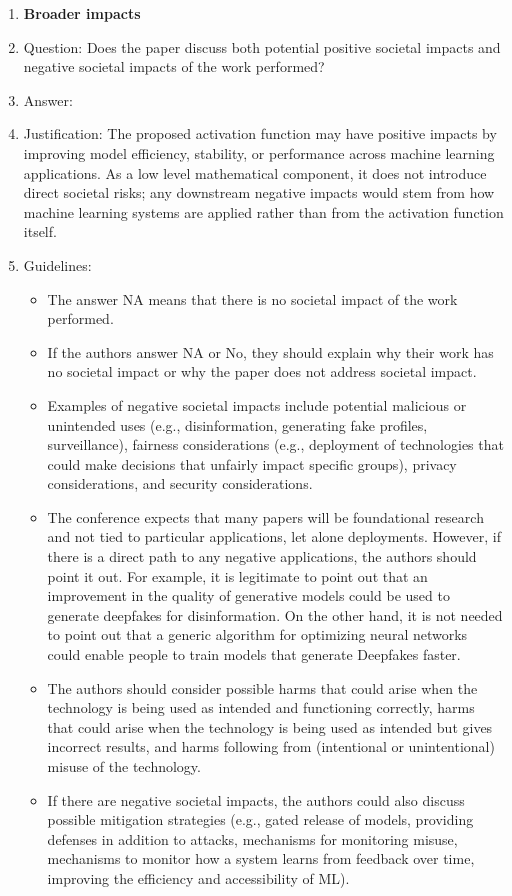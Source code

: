 \documentclass{article}
\begin{document}
\begin{enumerate}
\item {\bf Broader impacts}
    \item[] Question: Does the paper discuss both potential positive societal impacts and negative societal impacts of the work performed?
    \item[] Answer: \answerYes{} %
    \item[] Justification: The proposed activation function may have positive impacts by improving model efficiency, stability, or performance across machine learning applications. As a low level mathematical component, it does not introduce direct societal risks; any downstream negative impacts would stem from how machine learning systems are applied rather than from the activation function itself.
    \item[] Guidelines:
    \begin{itemize}
        \item The answer NA means that there is no societal impact of the work performed.
        \item If the authors answer NA or No, they should explain why their work has no societal impact or why the paper does not address societal impact.
        \item Examples of negative societal impacts include potential malicious or unintended uses (e.g., disinformation, generating fake profiles, surveillance), fairness considerations (e.g., deployment of technologies that could make decisions that unfairly impact specific groups), privacy considerations, and security considerations.
        \item The conference expects that many papers will be foundational research and not tied to particular applications, let alone deployments. However, if there is a direct path to any negative applications, the authors should point it out. For example, it is legitimate to point out that an improvement in the quality of generative models could be used to generate deepfakes for disinformation. On the other hand, it is not needed to point out that a generic algorithm for optimizing neural networks could enable people to train models that generate Deepfakes faster.
        \item The authors should consider possible harms that could arise when the technology is being used as intended and functioning correctly, harms that could arise when the technology is being used as intended but gives incorrect results, and harms following from (intentional or unintentional) misuse of the technology.
        \item If there are negative societal impacts, the authors could also discuss possible mitigation strategies (e.g., gated release of models, providing defenses in addition to attacks, mechanisms for monitoring misuse, mechanisms to monitor how a system learns from feedback over time, improving the efficiency and accessibility of ML).
    \end{itemize}
    

\end{enumerate}
\end{document}
